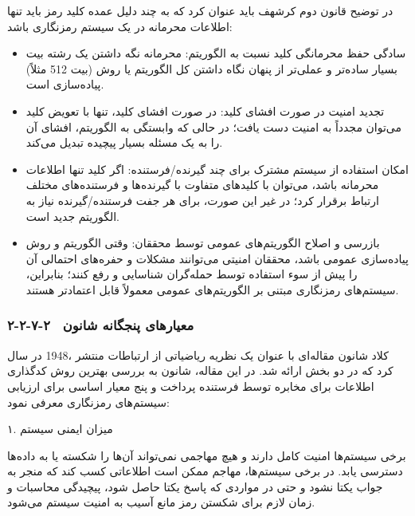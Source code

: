 در توضیح قانون دوم کرشهف باید عنوان کرد که به چند دلیل عمده کلید رمز باید تنها اطلاعات محرمانه در یک سیستم رمزنگاری باشد:

\begin{itemize}
    \item سادگی حفظ محرمانگی کلید نسبت به الگوریتم: محرمانه نگه داشتن یک رشته بیت (مثلاً ‎512‎ بیت) بسیار ساده‌تر و عملی‌تر از پنهان نگاه داشتن کل الگوریتم یا روش پیاده‌سازی است.
\end{itemize}

\begin{itemize}
    \item تجدید امنیت در صورت افشای کلید: در صورت افشای کلید، تنها با تعویض کلید می‌توان مجدداً به امنیت دست یافت؛ در حالی که وابستگی به الگوریتم، افشای آن را به یک مسئله بسیار پیچیده تبدیل می‌کند.
\end{itemize}

\begin{itemize}
    \item امکان استفاده از سیستم مشترک برای چند گیرنده/فرستنده: اگر کلید تنها اطلاعات محرمانه باشد، می‌توان با کلیدهای متفاوت با گیرنده‌ها و فرستنده‌های مختلف ارتباط برقرار کرد؛ در غیر این صورت، برای هر جفت فرستنده/گیرنده نیاز به الگوریتم جدید است.
\end{itemize}

\begin{itemize}
    \item بازرسی و اصلاح الگوریتم‌های عمومی توسط محققان: وقتی الگوریتم و روش پیاده‌سازی عمومی باشد، محققان امنیتی می‌توانند مشکلات و حفره‌های احتمالی آن را پیش از سوء استفاده توسط حمله‌گران شناسایی و رفع کنند؛ بنابراین، سیستم‌های رمزنگاری مبتنی بر الگوریتم‌های عمومی معمولاً قابل اعتمادتر هستند\cite{ref36}.
\end{itemize}

\subsubsection{۲-۲-۷-۲  معیارهای پنجگانه شانون}

در سال ‎1948‎، کلاد شانون مقاله‌ای با عنوان یک نظریه ریاضیاتی از ارتباطات منتشر کرد که در دو بخش ارائه شد. در این مقاله، شانون به بررسی بهترین روش کدگذاری اطلاعات برای مخابره توسط فرستنده پرداخت و پنج معیار اساسی برای ارزیابی سیستم‌های رمزنگاری معرفی نمود\cite{ref37}:

۱. میزان ایمنی سیستم

برخی سیستم‌ها امنیت کامل دارند و هیچ مهاجمی نمی‌تواند آن‌ها را شکسته یا به داده‌ها دسترسی یابد. در برخی سیستم‌ها، مهاجم ممکن است اطلاعاتی کسب کند که منجر به جواب یکتا نشود و حتی در مواردی که پاسخ یکتا حاصل شود، پیچیدگی محاسبات و زمان لازم برای شکستن رمز مانع آسیب به امنیت سیستم می‌شود.

